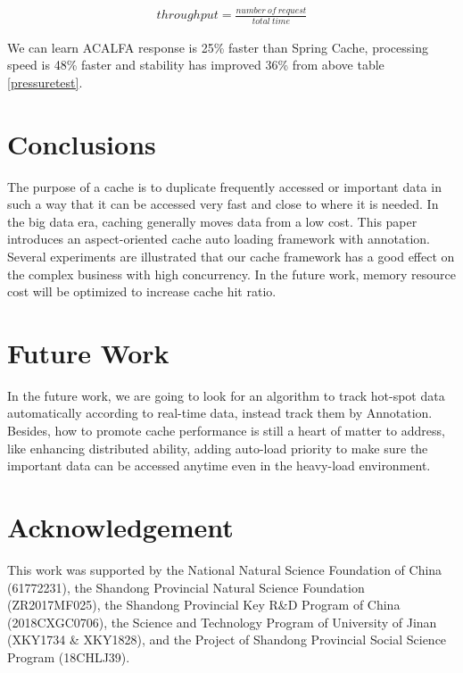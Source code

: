 \documentclass{singlecol-new}
\theoremstyle{TH}{
\newtheorem{lemma}{Lemma}
\newtheorem{theorem}[lemma]{Theorem}
\newtheorem{corrolary}[lemma]{Corrolary}
\newtheorem{conjecture}[lemma]{Conjecture}
\newtheorem{proposition}[lemma]{Proposition}
\newtheorem{claim}[lemma]{Claim}
\newtheorem{stheorem}[lemma]{Wrong Theorem}
}
\theoremstyle{THrm}{
\newtheorem{definition}{Definition}[section]
\newtheorem{question}{Question}[section]
\newtheorem{remark}{Remark}
\newtheorem{scheme}{Scheme}
}
\theoremstyle{THhit}{
\newtheorem{case}{Case}[section]
}
\begin{document}
 \begin{center}
 \begin{eqnarray}
     \label{throughput}
     throughput = \frac{number\ of\ request}{total\ time}
 \end{eqnarray}
 \end{center}

 We can learn ACALFA response is 25\% faster than Spring Cache, processing speed is 48\% faster and stability has improved 36\% from above table \ref{pressuretest}.

\section{Conclusions}
\label{Conclusions}

The purpose of a cache is to duplicate frequently accessed or important data in such a way that it can be accessed very fast and close to where it is needed. In the big data era, caching generally moves data from a low cost. This paper introduces an aspect-oriented cache auto loading framework with annotation. Several experiments are illustrated that our cache framework has a good effect on the complex business with high concurrency. In the future work, memory resource cost will be optimized to increase cache hit ratio.

\section{Future Work}
\label{futurework}

In the future work, we are going to look for an algorithm to track hot-spot data automatically according to real-time data, instead track them by Annotation. Besides, how to promote cache performance is still a heart of matter to address, like enhancing distributed ability, adding auto-load priority to make sure the important data can be accessed anytime even in the heavy-load environment.


\section*{Acknowledgement}
This work was supported by the National Natural Science Foundation of China (61772231), the Shandong Provincial Natural Science Foundation (ZR2017MF025), the Shandong Provincial Key R\&D Program of China (2018CXGC0706), the Science and Technology Program of University of Jinan (XKY1734 \& XKY1828), and the Project of Shandong Provincial Social Science Program (18CHLJ39).



%
%
%



\end{document}
